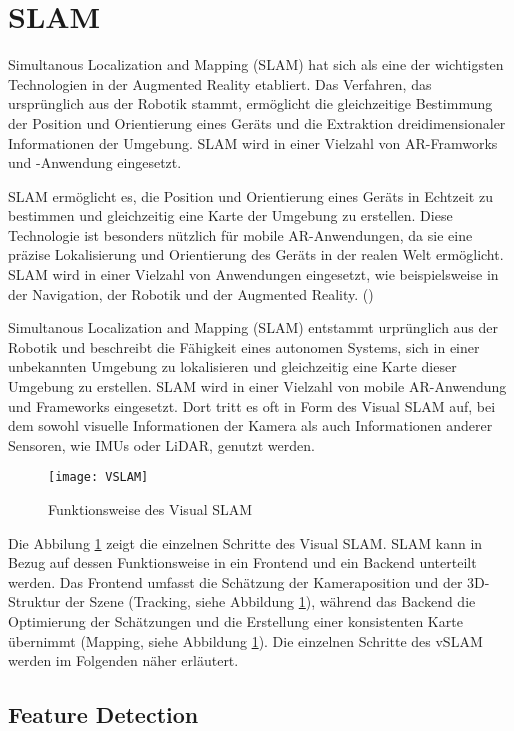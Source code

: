 \section{SLAM}\label{SLAM}

Simultanous Localization and Mapping (SLAM) hat sich als eine der wichtigsten Technologien in der Augmented Reality etabliert. Das Verfahren, das ursprünglich aus der Robotik stammt, ermöglicht die gleichzeitige Bestimmung der Position und Orientierung eines Geräts und die Extraktion dreidimensionaler Informationen der Umgebung. SLAM wird in einer Vielzahl von AR-Framworks und -Anwendung eingesetzt.


SLAM ermöglicht es, die Position und Orientierung eines Geräts in Echtzeit zu bestimmen und gleichzeitig eine Karte der Umgebung zu erstellen. Diese Technologie ist besonders nützlich für mobile AR-Anwendungen, da sie eine präzise Lokalisierung und Orientierung des Geräts in der realen Welt ermöglicht. SLAM wird in einer Vielzahl von Anwendungen eingesetzt, wie beispielsweise in der Navigation, der Robotik und der Augmented Reality. (\cite{doerner2022virtual})

Simultanous Localization and Mapping (SLAM) entstammt urprünglich aus der Robotik und beschreibt die Fähigkeit eines autonomen Systems, sich in einer unbekannten Umgebung zu lokalisieren und gleichzeitig eine Karte dieser Umgebung zu erstellen. SLAM wird in einer Vielzahl von mobile AR-Anwendung und Frameworks eingesetzt. Dort tritt es oft in Form des Visual SLAM auf, bei dem sowohl visuelle Informationen der Kamera als auch Informationen anderer Sensoren, wie IMUs oder LiDAR, genutzt werden. 

\begin{figure}
    \centering
    \texttt{[image: VSLAM]}
    \caption{Funktionsweise des Visual SLAM\label{fig:VSLAM}}\par
\end{figure}

Die Abbilung \ref{fig:VSLAM} zeigt die einzelnen Schritte des Visual SLAM. SLAM kann in Bezug auf dessen Funktionsweise in ein Frontend und ein Backend unterteilt werden. Das Frontend umfasst die Schätzung der Kameraposition und der 3D-Struktur der Szene (Tracking, siehe Abbildung \ref{fig:VSLAM}), während das Backend die Optimierung der Schätzungen und die Erstellung einer konsistenten Karte übernimmt (Mapping, siehe Abbildung \ref{fig:VSLAM}). Die einzelnen Schritte des vSLAM werden im Folgenden näher erläutert.

\subsection{Feature Detection}

